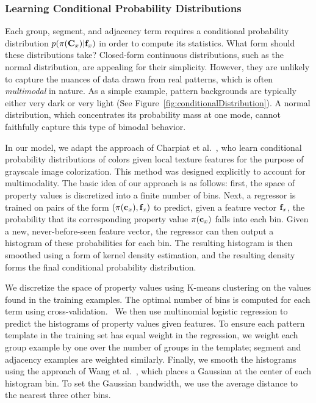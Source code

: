 \subsubsection{Learning Conditional Probability Distributions}
\label{sec:learningPdfs}

Each group, segment, and adjacency term requires a conditional probability distribution $p(\pi(\mathbf{C}_x)|\mathbf{f}_x)$ in order to compute its statistics. What form should these distributions take? Closed-form continuous distributions, such as the normal distribution, are appealing for their simplicity.  However, they are unlikely to capture the nuances of data drawn from real patterns, which is often \emph{multimodal} in nature. As a simple example, pattern backgrounds are typically either very dark or very light (See Figure~\ref{fig:conditionalDistribution}). A normal distribution, which concentrates its probability mass at one mode, cannot faithfully capture this type of bimodal behavior.

In our model, we adapt the approach of Charpiat et al.~, who learn conditional probability distributions of colors given local texture features for the purpose of grayscale image colorization. This method was designed explicitly to account for multimodality. The basic idea of our approach is as follows: first, the space of property values is discretized into a finite number of bins. Next, a regressor is trained on pairs of the form $(\pi(\mathbf{c}_x), \mathbf{f}_x)$ to predict, given a feature vector $\mathbf{f}_x$, the probability that its corresponding property value $\pi(\mathbf{c}_x)$ falls into each bin. Given a new, never-before-seen feature vector, the regressor can then output a histogram of these probabilities for each bin. The resulting histogram is then smoothed using a form of kernel density estimation, and the resulting density forms the final conditional probability distribution.

We discretize the space of property values using K-means clustering on the values found in the training examples. The optimal number of bins is computed for each term using cross-validation.~ We then use multinomial logistic regression to predict the histograms of property values given features. To ensure each pattern template in the training set has equal weight in the regression, we weight each group example by one over the number of groups in the template; segment and adjacency examples are weighted similarly. Finally, we smooth the histograms using the approach of Wang et al.~, which places a Gaussian at the center of each histogram bin. To set the Gaussian bandwidth, we use the average distance to the nearest three other bins.


